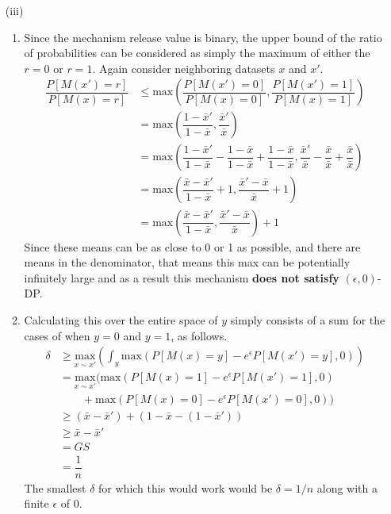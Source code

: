 \documentclass[12pt]{article}
\begin{document}
\begin{enumerate}
\begin{enumerate}
	\end{enumerate}
	\item[(iii)] 
	\begin{enumerate}
	\item Since the mechanism release value is binary, the upper bound of the ratio of probabilities can be considered as simply the maximum of either the $r=0$ or $r=1$. Again consider neighboring datasets $x$ and $x'$.
	\begin{align*}
		\dfrac{P[M(x') = r]}{P[M(x)=r]} &\leq \text{max}\left(\dfrac{P[M(x') = 0]}{P[M(x)=0]}, \dfrac{P[M(x') = 1]}{P[M(x)=1]}\right)\\
		&= \text{max}\left(\dfrac{1-\bar{x}'}{1-\bar{x}}, \dfrac{\bar{x}'}{\bar{x}}\right)\\
		&= \text{max}\left(\dfrac{1-\bar{x}'}{1-\bar{x}} - \dfrac{1-\bar{x}}{1-\bar{x}} + \dfrac{1-\bar{x}}{1-\bar{x}} , \dfrac{\bar{x}'}{\bar{x}} - \dfrac{\bar{x}}{\bar{x}} + \dfrac{\bar{x}}{\bar{x}}\right)\\
		&= \text{max}\left(\dfrac{\bar{x}-\bar{x}'}{1-\bar{x}} + 1, \dfrac{\bar{x}'-\bar{x}}{\bar{x}} + 1\right)\\
		&= \text{max}\left(\dfrac{\bar{x}-\bar{x}'}{1-\bar{x}}, \dfrac{\bar{x}'-\bar{x}}{\bar{x}}\right)+1
	\end{align*}
	Since these means can be as close to 0 or 1 as possible, and there are means in the denominator, that means this max can be potentially infinitely large and as a result this mechanism \textbf{does not satisfy} $(\epsilon, 0)$-DP.
	\item Calculating this over the entire space of $y$ simply consists of a sum for the cases of when $y=0$ and $y=1$, as follows.
	\begin{align*}
		\delta &\geq \underset{x\sim x'}{\text{max}}\left(\int_y \text{max}\left(P[M(x) = y]-e^{\epsilon}P[M(x')=y], 0\right)\right)\\
		&= \underset{x\sim x'}{\text{max}}(\text{max}\left(P[M(x) = 1]-e^{\epsilon}P[M(x')=1], 0\right)\\ &\qquad+ \text{max}\left(P[M(x) = 0]-e^{\epsilon}P[M(x')=0], 0\right))\\
		&\geq (\bar{x} - \bar{x}') + (1-\bar{x} - (1-\bar{x}'))\\
		&\geq \bar{x} - \bar{x}'\\
		&= GS\\
		&= \dfrac{1}{n}
	\end{align*}
	The smallest $\delta$ for which this would work would be $\boxed{\delta = 1/n}$ along with a finite $\epsilon$ of 0.

\end{enumerate}
\end{enumerate}
\end{document}
